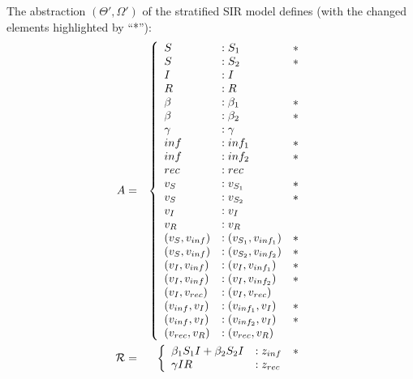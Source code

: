 \begin{example}
    The abstraction $(\Theta', \Omega')$ of the stratified SIR model defines
    (with the changed elements highlighted by ``*''):
    \begin{eqnarray*}
        A &=& \left\{ 
            \begin{array}{lll}
                S &: S_1 &*\\
                S &: S_2&*\\
                I &: I\\
                R &: R\\
               \beta &: \beta_1&*\\
               \beta &: \beta_2&*\\
               \gamma &: \gamma\\
               inf&: inf_1&*\\
               inf&: inf_2&*\\
               rec&: rec\\
               v_S &: v_{S_1}&*\\
               v_S &: v_{S_2}&*\\
               v_I &: v_{I}\\
               v_R &: v_{R}\\
               (v_{S}, v_{inf}) &: (v_{S_1}, v_{inf_1})&*\\
               (v_{S}, v_{inf}) &: (v_{S_2}, v_{inf_2})&*\\
               (v_{I}, v_{inf}) &: (v_{I}, v_{inf_1})&*\\
               (v_{I}, v_{inf}) &: (v_{I}, v_{inf_2})&*\\
               (v_I, v_{rec}) &: (v_I, v_{rec})\\
               (v_{inf}, v_I) &: (v_{inf_1}, v_I)&*\\
               (v_{inf}, v_I) &: (v_{inf_2}, v_I)&*\\
               (v_{rec}, v_R) &: (v_{rec}, v_R)\\
            \end{array}\right.\\
            {\cal R} &=& \left\{ 
            \begin{array}{lll}
                \beta_1 S_1 I +  \beta_2 S_2 I& : z_{inf}&*\\
                \gamma I R & : z_{rec}\\
            \end{array}\right.\\
    \end{eqnarray*}
\end{example}

